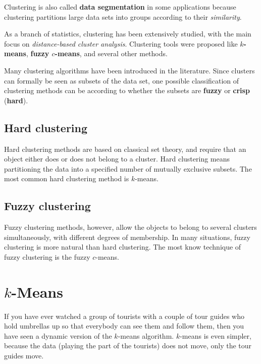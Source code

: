 \documentclass[]{book}
\begin{document}
Clustering is also called \textbf{data segmentation} in some
applications because clustering partitions large data sets into groups
according to their \emph{similarity}.

As a branch of statistics, clustering has been extensively studied, with
the main focus on \emph{distance-based cluster analysis}. Clustering
tools were proposed like \textbf{\(k\)-means}, \textbf{fuzzy
\(c\)-means}, and several other methods.

Many clustering algorithms have been introduced in the literature. Since
clusters can formally be seen as subsets of the data set, one possible
classification of clustering methods can be according to whether the
subsets are \textbf{fuzzy} or \textbf{crisp} (\textbf{hard}).

\subsection*{Hard clustering}\label{hard-clustering}

Hard clustering methods are based on classical set theory, and require
that an object either does or does not belong to a cluster. Hard
clustering means partitioning the data into a specified number of
mutually exclusive subsets. The most common hard clustering method is
\(k\)-means.

\subsection*{Fuzzy clustering}\label{fuzzy-clustering}

Fuzzy clustering methods, however, allow the objects to belong to
several clusters simultaneously, with different degrees of membership.
In many situations, fuzzy clustering is more natural than hard
clustering. The most know technique of fuzzy clustering is the fuzzy
\(c\)-means.

\section{\texorpdfstring{\(k\)-Means}{k-Means}}\label{k-means}

If you have ever watched a group of tourists with a couple of tour
guides who hold umbrellas up so that everybody can see them and follow
them, then you have seen a dynamic version of the \(k\)-means algorithm.
\(k\)-means is even simpler, because the data (playing the part of the
tourists) does not move, only the tour guides move.
\end{document}
